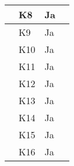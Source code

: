 \documentclass[class=article, crop=false]{standalone}
\begin{document}
\begin{table}[]
\begin{tabular}{|l|l|l|l|}
            & K8       & Ja                 &                                                                                                                                                                                                    \\ \hline
            & K9       & Ja                 &                                                                                                                                                                                                    \\ \hline
            & K10      & Ja                 &                                                                                                                                                                                                    \\ \hline
            & K11      & Ja                 &                                                                                                                                                                                                    \\ \hline
            & K12      & Ja                 &                                                                                                                                                                                                    \\ \hline
            & K13      & Ja                 &                                                                                                                                                                                                    \\ \hline
            & K14      & Ja                 &                                                                                                                                                                                                    \\ \hline
            & K15      & Ja                 &                                                                                                                                                                                                    \\ \hline
            & K16      & Ja                 &                                                                                                                                                                                                    \\ \hline

\end{tabular}
\end{table}
\end{document}
